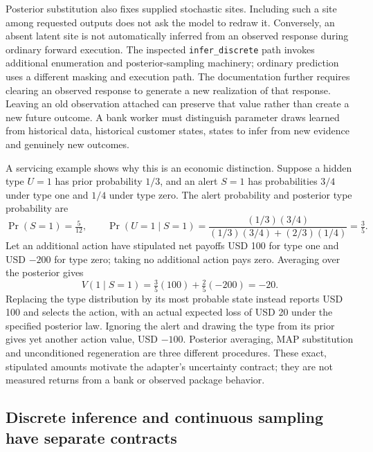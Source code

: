Posterior substitution also fixes supplied stochastic sites. Including such a site among requested outputs does not ask the model to redraw it. Conversely, an absent latent site is not automatically inferred from an observed response during ordinary forward execution. The inspected \texttt{infer\_discrete} path invokes additional enumeration and posterior-sampling machinery; ordinary prediction uses a different masking and execution path. The documentation further requires clearing an observed response to generate a new realization of that response. Leaving an old observation attached can preserve that value rather than create a new future outcome. A bank worker must distinguish parameter draws learned from historical data, historical customer states, states to infer from new evidence and genuinely new outcomes. \cite{exec23_numpyro_sources}

A servicing example shows why this is an economic distinction. Suppose a hidden type $U=1$ has prior probability $1/3$, and an alert $S=1$ has probabilities $3/4$ under type one and $1/4$ under type zero. The alert probability and posterior type probability are
\begin{equation}
 \Pr(S=1)=\tfrac{5}{12},\qquad
 \Pr(U=1\mid S=1)=
 \frac{(1/3)(3/4)}{(1/3)(3/4)+(2/3)(1/4)}=\tfrac35.
\end{equation}
Let an additional action have stipulated net payoffs USD 100 for type one and USD $-200$ for type zero; taking no additional action pays zero. Averaging over the posterior gives
\begin{equation}
 V(1\mid S=1)=\tfrac35(100)+\tfrac25(-200)=-20.
\end{equation}
Replacing the type distribution by its most probable state instead reports USD 100 and selects the action, with an actual expected loss of USD 20 under the specified posterior law. Ignoring the alert and drawing the type from its prior gives yet another action value, USD $-100$. Posterior averaging, MAP substitution and unconditioned regeneration are three different procedures. These exact, stipulated amounts motivate the adapter's uncertainty contract; they are not measured returns from a bank or observed package behavior. \cite{exec23_numpyro_reference}

\subsection{Discrete inference and continuous sampling have separate contracts}

